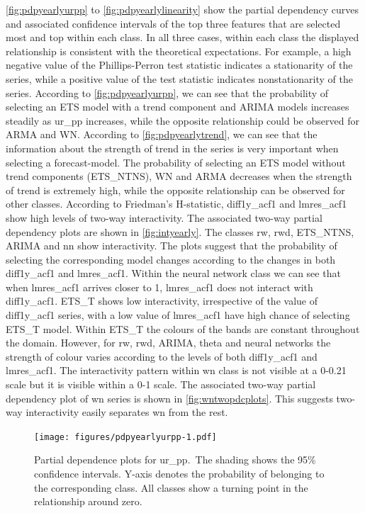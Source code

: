 \documentclass[11pt,a4paper,]{article}
\begin{document}
\autoref{fig:pdpyearlyurpp} to \autoref{fig:pdpyearlylinearity} show the partial dependency curves and associated confidence intervals of the top three features that are selected most and top within each class. In all three cases, within each class the displayed relationship is consistent with the theoretical expectations. For example, a high negative value of the Phillips-Perron test statistic indicates a stationarity of the series, while a positive value of the test statistic indicates nonstationarity of the series. According to \autoref{fig:pdpyearlyurpp}, we can see that the probability of selecting an ETS model with a trend component and ARIMA models increases steadily as ur\_pp increases, while the opposite relationship could be observed for ARMA and WN. According to \autoref{fig:pdpyearlytrend}, we can see that the information about the strength of trend in the series is very important when selecting a forecast-model. The probability of selecting an ETS model without trend components (ETS\_NTNS), WN and ARMA decreases when the strength of trend is extremely high, while the opposite relationship can be observed for other classes. According to Friedman's H-statistic, diff1y\_acf1 and lmres\_acf1 show high levels of two-way interactivity. The associated two-way partial dependency plots are shown in \autoref{fig:intyearly}. The classes rw, rwd, ETS\_NTNS, ARIMA and nn show interactivity. The plots suggest that the probability of selecting the corresponding model changes according to the changes in both diff1y\_acf1 and lmres\_acf1. Within the neural network class we can see that when lmres\_acf1 arrives closer to 1, lmres\_acf1 does not interact with diff1y\_acf1. ETS\_T shows low interactivity, irrespective of the value of diff1y\_acf1 series, with a low value of lmres\_acf1 have high chance of selecting ETS\_T model. Within ETS\_T the colours of the bands are constant throughout the domain. However, for rw, rwd, ARIMA, theta and neural networks the strength of colour varies according to the levels of both diff1y\_acf1 and lmres\_acf1. The interactivity pattern within wn class is not visible at a 0-0.21 scale but it is visible within a 0-1 scale. The associated two-way partial dependency plot of wn series is shown in \autoref{fig:wntwopdcplots}. This suggests two-way interactivity easily separates wn from the rest.

\begin{figure}
\centering
\texttt{[image: figures/pdpyearlyurpp-1.pdf]}
\caption{\label{fig:pdpyearlyurpp}Partial dependence plots for ur\_pp.~The shading shows the 95\% confidence intervals. Y-axis denotes the probability of belonging to the corresponding class. All classes show a turning point in the relationship around zero.}
\end{figure}
\end{document}
